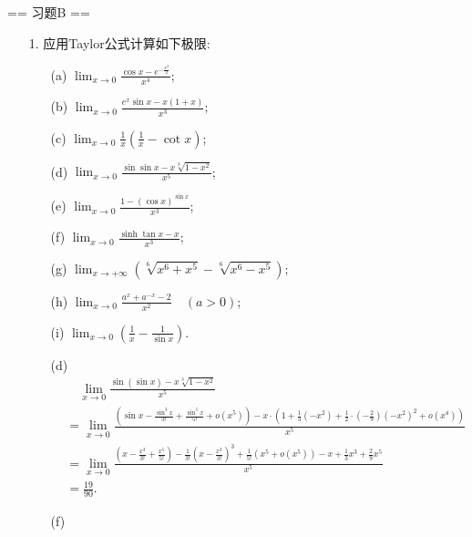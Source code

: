== 习题B ==

\begin{enumerate}
    \item[1.]应用Taylor公式计算如下极限:
    \begin{enumerate}
        \item[(a)]$\displaystyle \lim_{x\to 0}\frac{\cos x - e^{-\frac{x^2}{2}}}{x^4}$;
        \item[(b)]$\displaystyle \lim_{x\to 0}\frac{e^x\sin x - x(1 + x)}{x^3}$;
        \item[(c)]$\displaystyle \lim_{x\to 0}\frac{1}{x}\left(\frac{1}{x} -\cot x\right)$;
        \item[(d)]$\displaystyle \lim_{x\to 0}\frac{\sin\sin x - x\sqrt[3]{1 - x^2}}{x^5}$;
        \item[(e)]$\displaystyle \lim_{x\to 0}\frac{1 - (\cos x)^{\sin x}}{x^3}$;
        \item[(f)]$\displaystyle \lim_{x\to 0}\frac{\sinh\tan x - x}{x^3}$;
        \item[(g)]$\displaystyle \lim_{x\to +\infty}\left(\sqrt[6]{x^6 + x^5} -\sqrt[6]{x^6 - x^5}\right)$;
        \item[(h)]$\displaystyle \lim_{x\to 0}\frac{a^x + a^{-x} - 2}{x^2}\quad (a > 0)$;
        \item[(i)]$\displaystyle \lim_{x\to 0}\left(\frac{1}{x} -\frac{1}{\sin x}\right)$.
    \end{enumerate}
    \begin{solution}
        \begin{enumerate}
            \item[(d)]\\
            \[
            \begin{aligned}
            &\quad\lim_{x\to 0}\frac{\sin(\sin{x})-x\sqrt[3]{1-x^2}}{x^5}\\
            &=\lim_{x\to 0}\frac{(\sin{x}-\frac{\sin^3x}{3!}+\frac{\sin^5x}{5!}+o(x^5))-x\cdot(1+\frac{1}{3}(-x^2)+\frac{1}{2}\cdot(-\frac{2}{9})(-x^2)^2+o(x^4))}{x^5}\\
            &=\lim_{x\to 0}\frac{\left(x-\frac{x^3}{3!}+\frac{x^5}{5!}\right)-\frac{1}{3!}\left(x-\frac{x^3}{3!}\right)^3+\frac{1}{5!}\left(x^5+o(x^5)\right)-x+\frac{1}{3}x^3+\frac{2}{9}x^5}{x^5}\\
            &=\frac{19}{90}.
            \end{aligned}
            \]
            \item[(f)]\\
            \[
            \begin{aligned}

\end{aligned}\]
\end{enumerate}
\end{solution}
\end{enumerate}
